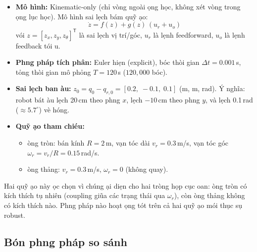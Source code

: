 \documentclass[12pt,a4paper]{article}
\newcommand{\T}{\mathsf{T}}
\begin{document}
\begin{itemize}
    \item \textbf{M\^{o} h\`{i}nh:} Kinematic-only (ch\h{i} v\`{o}ng ngo\`{a}i \dj\d{o}ng h\d{o}c, kh\^{o}ng x\'{e}t v\`{o}ng trong \dj\d{o}ng l\d{u}c h\d{o}c). M\^{o} h\`{i}nh sai l\d{e}ch b\'{a}m qu\~{y} \dj\d{a}o:
    \begin{equation}
        \dot{z} = f(z) + g(z)\,(u_r + u_o)
    \end{equation}
    v\'{o}i $z = [z_x, z_y, z_\theta]^\T$ l\`{a} sai l\d{e}ch v\d{i} tr\'{i}/g\'{o}c, $u_r$ l\`{a} l\d{e}nh feedforward, $u_o$ l\`{a} l\d{e}nh feedback t\'{o}i \uhorn{}u.

    \item \textbf{Ph\uhorn{}\ohorn{}ng ph\'{a}p t\'{i}ch ph\^{a}n:} Euler hi\d{e}n (explicit), b\uhorn{}\'{o}c th\`{o}i gian $\Delta t = 0.001$\,s, t\h{o}ng th\`{o}i gian m\^{o} ph\h{o}ng $T = 120$\,s ($120{,}000$ b\uhorn{}\'{o}c).

    \item \textbf{Sai l\d{e}ch ban \dj\`{a}u:} $z_0 = q_0 - q_{r,0} = [0.2,\; -0.1,\; 0.1]$ (m, m, rad). \'{Y} ngh\~{i}a: robot b\'{a}t \dj\`{a}u l\d{e}ch 20\,cm theo ph\uhorn{}\ohorn{}ng $x$, l\d{e}ch $-10$\,cm theo ph\uhorn{}\ohorn{}ng $y$, v\`{a} l\d{e}ch 0.1\,rad ($\approx 5.7^\circ$) v\`{e} h\uhorn{}\'{o}ng.

    \item \textbf{Qu\~{y} \dj\d{a}o tham chi\'{e}u:}
    \begin{itemize}[nosep]
        \item \DJ\uhorn{}\`{o}ng tr\`{o}n: b\'{a}n k\'{i}nh $R = 2$\,m, v\d{a}n t\'{o}c d\`{a}i $v_r = 0.3$\,m/s, v\d{a}n t\'{o}c g\'{o}c $\omega_r = v_r/R = 0.15$\,rad/s.
        \item \DJ\uhorn{}\`{o}ng th\h{a}ng: $v_r = 0.3$\,m/s, $\omega_r = 0$ (kh\^{o}ng quay).
    \end{itemize}
\end{itemize}

Hai qu\~{y} \dj\d{a}o n\`{a}y \dj\uhorn{}\d{o}c ch\d{o}n v\`{i} ch\'{u}ng \dj\d{a}i di\d{e}n cho hai tr\uhorn{}\`{o}ng h\d{o}p c\d{u}c \dj oan: \dj\uhorn{}\`{o}ng tr\`{o}n c\'{o} k\'{i}ch th\'{i}ch t\d{u} nhi\^{e}n (coupling gi\~{u}a c\'{a}c tr\d{a}ng th\'{a}i qua $\omega_r$), c\`{o}n \dj\uhorn{}\`{o}ng th\h{a}ng kh\^{o}ng c\'{o} k\'{i}ch th\'{i}ch n\`{a}o. Ph\uhorn{}\ohorn{}ng ph\'{a}p n\`{a}o ho\d{a}t \dj\d{o}ng t\'{o}t tr\^{e}n c\h{a} hai qu\~{y} \dj\d{a}o m\'{o}i th\d{u}c s\d{u} robust.

\subsection{B\'{o}n ph\uhorn{}\ohorn{}ng ph\'{a}p so s\'{a}nh}
\end{document}

